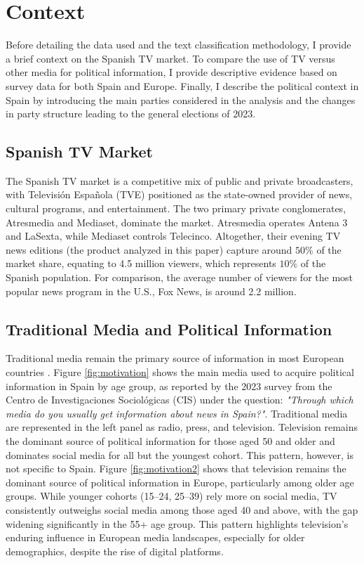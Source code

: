 \documentclass[12pt]{article}
\begin{document}
	
	
	\section{Context}
	
	Before detailing the data used and the text classification methodology, I provide a brief context on the Spanish TV market. To compare the use of TV versus other media for political information, I provide descriptive evidence based on survey data for both Spain and Europe. Finally, I describe the political context in Spain by introducing the main parties considered in the analysis and the changes in party structure leading to the general elections of 2023.
	
	\label{section:context}
	
	\subsection*{Spanish TV Market}
	
	The Spanish TV market is a competitive mix of public and private broadcasters, with Televisión Española (TVE) positioned as the state-owned provider of news, cultural programs, and entertainment. The two primary private conglomerates, Atresmedia and Mediaset, dominate the market. Atresmedia operates Antena 3 and LaSexta, while Mediaset controls Telecinco. Altogether, their evening TV news editions (the product analyzed in this paper) capture around $50\%$ of the market share, equating to 4.5 million viewers, which represents $10\%$ of the Spanish population. For comparison, the average number of viewers for the most popular news program in the U.S., Fox News, is around 2.2 million.
	
	\subsection*{Traditional Media and Political Information}
	
	Traditional media remain the primary source of information in most European countries \citep{europarl2024}. Figure \ref{fig:motivation} shows the main media used to acquire political information in Spain by age group, as reported by the 2023 survey from the Centro de Investigaciones Sociológicas (CIS) under the question: \textit{"Through which media do you usually get information about news in Spain?"}. Traditional media are represented in the left panel as radio, press, and television. Television remains the dominant source of political information for those aged 50 and older and dominates social media for all but the youngest cohort. This pattern, however, is not specific to Spain. Figure \ref{fig:motivation2} shows that television remains the dominant source of political information in Europe, particularly among older age groups. While younger cohorts (15--24, 25--39) rely more on social media, TV consistently outweighs social media among those aged 40 and above, with the gap widening significantly in the 55+ age group. This pattern highlights television’s enduring influence in European media landscapes, especially for older demographics, despite the rise of digital platforms.
	
\end{document}
